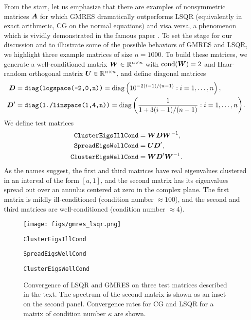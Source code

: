 \documentclass[onefignum,onetabnum,pagebackref,dvipsnames]{siamart220329}
\begin{document}
From the start, let us emphasize that there are examples of nonsymmetric matrices $\boldsymbol{A}$ for which GMRES dramatically outperforms LSQR (equivalently in exact arithmetic, CG on the normal equations) and visa versa, a phenomenon which is vividly demonstrated in the famous paper \cite{NRT92}.
To set the stage for our discussion and to illustrate some of the possible behaviors of GMRES and LSQR, we highlight three example matrices of size $n=1000$.
To build these matrices, we generate a well-conditioned matrix $\boldsymbol{W} \in \mathbb{R}^{n\times n}$ with $\operatorname{cond}(\boldsymbol{W}) = 2$ and Haar-random orthogonal matrix $\boldsymbol{U} \in \mathbb{R}^{n\times n}$, and define diagonal matrices
%
\begin{align*}
    \boldsymbol{D} &= \texttt{diag(logspace(-2,0,n))} = \operatorname{diag}\left( 10^{-2(i-1)/(n-1)} : i = 1,\ldots,n \right), \\
    \boldsymbol{D}' &= \texttt{diag(1./linspace(1,4,n))} = \operatorname{diag}\left( \frac{1}{1 + 3(i-1)/(n-1)} : i = 1,\ldots,n \right).
\end{align*}
%
We define test matrices 
%
\begin{align*}
    \texttt{ClusterEigsIllCond} &= \boldsymbol{W}\boldsymbol{D}\boldsymbol{W}^{-1}, \\
    \texttt{SpreadEigsWellCond} &= \boldsymbol{U}\boldsymbol{D}', \\
    \texttt{ClusterEigsWellCond} &= \boldsymbol{W}\boldsymbol{D}'\boldsymbol{W}^{-1}.
\end{align*}
%
As the names suggest, the first and third matrices have real eigenvalues clustered in an interval of the form $[a,1]$, and the second matrix has its eigenvalues spread out over an annulus centered at zero in the complex plane.
The first matrix is mildly ill-conditioned (condition number $\approx 100$), and the second and third matrices are well-conditioned (condition number $\approx 4$). 

\begin{figure}[t]
    \centering
    \texttt{[image: figs/gmres\_lsqr.png]}

    \parbox{0.32\linewidth}{\centering \texttt{ClusterEigsIllCond}}
    \parbox{0.32\linewidth}{\centering \texttt{SpreadEigsWellCond}}
    \parbox{0.32\linewidth}{\centering \texttt{ClusterEigsWellCond}}
    
    \caption{Convergence of LSQR and GMRES on three test matrices described in the text.
    The spectrum of the second matrix is shown as an inset on the second panel.
    Convergence rates for CG and LSQR for a matrix of condition number $\kappa$ are shown.}
    \label{fig:gmres-lsqr}
\end{figure}
\end{document}
